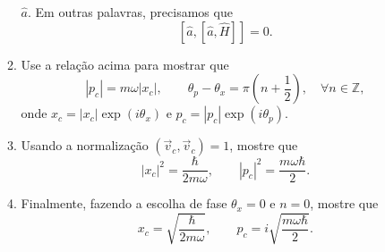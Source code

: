 \begin{enumerate}
\begin{enumerate}
                $\hat{a}$. Em outras palavras, precisamos que
                $$[\hat{a}, [\hat{a},\hat{H}]] = 0.$$
          \item Use a relação acima para mostrar que
                $$|p_c| = m\omega|x_c|,\qquad \theta_p - \theta_x = \pi\left(n+\frac{1}{2}\right),
                  \quad \forall n \in \mathbb{Z},$$
                onde $x_c = |x_c|\exp(i\theta_x)$ e $p_c = |p_c|\exp(i\theta_p)$.
          \item Usando a normalização $\left(\vec{v}_c, \vec{v}_c\right) = 1$, mostre que
                $$|x_c|^2 = \frac{\hbar}{2m\omega},\qquad |p_c|^2 = \frac{m\omega\hbar}{2}.$$
          \item Finalmente, fazendo a escolha de fase $\theta_x = 0$ e $n=0$, mostre que
                $$x_c = \sqrt{\frac{\hbar}{2m\omega}},\qquad p_c = i\sqrt{\frac{m\omega\hbar}{2}}.$$
        \end{enumerate}
\end{enumerate}

